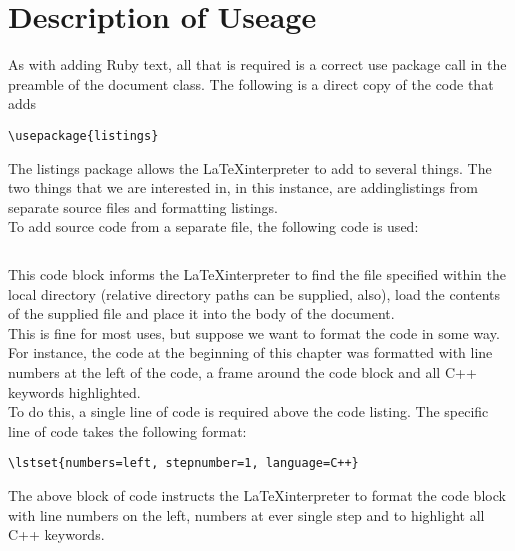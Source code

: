 \section{Description of Useage}
As with adding Ruby text, all that is required is a correct use package call in the preamble of the document class. The following is a direct copy of the code that adds 
	\begin{lstlisting}
\usepackage{listings}
	\end{lstlisting}
The listings package allows the \LaTeX interpreter to add to several things. The two things that we are interested in, in this instance, are addinglistings from separate source files and formatting listings.\\
\indent{}To add source code from a separate file, the following code is used:
	\begin{lstlisting}

	\end{lstlisting}
This code block informs the \LaTeX interpreter to find the file specified within the local directory (relative directory paths can be supplied, also), load the contents of the supplied file and place it into the body of the document.\\
\indent{}This is fine for most uses, but suppose we want to format the code in some way. For instance, the code at the beginning of this chapter was formatted with line numbers at the left of the code, a frame around the code block and all C++ keywords highlighted.\\
\indent{}To do this, a single line of code is required above the code listing. The specific line of code takes the following format:
	\begin{lstlisting}
\lstset{numbers=left, stepnumber=1, language=C++}
	\end{lstlisting}
The above block of code instructs the \LaTeX interpreter to format the code block with line numbers on the left, numbers at ever single step and to highlight all C++ keywords.